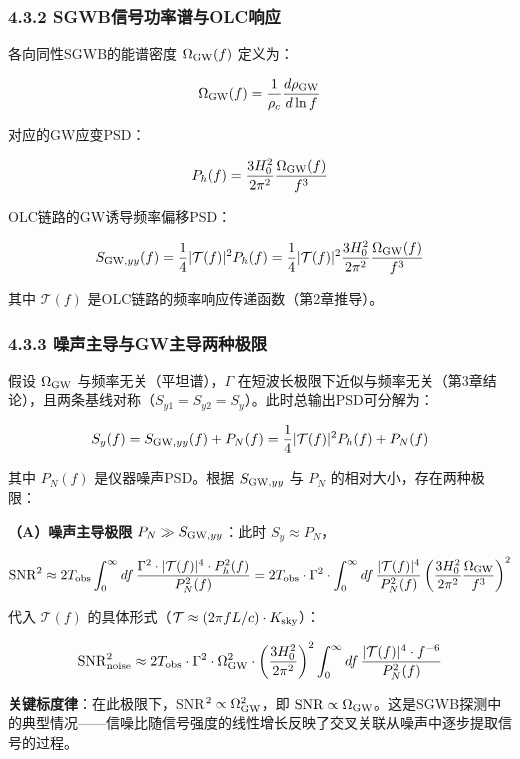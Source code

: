 \documentclass[12pt,a4paper]{article}
\begin{document}
\subsubsection{4.3.2 SGWB信号功率谱与OLC响应}


各向同性SGWB的能谱密度 $\Omega_{\rm GW}(f)$ 定义为：

$$\Omega_{\rm GW}(f) = \frac{1}{\rho_c} \frac{d\rho_{\rm GW}}{d\ln f}$$

对应的GW应变PSD：

$$P_h(f) = \frac{3H_0^2}{2\pi^2} \frac{\Omega_{\rm GW}(f)}{f^3}$$

OLC链路的GW诱导频率偏移PSD：

$$S_{{\rm GW},yy}(f) = \frac{1}{4} |\mathcal{T}(f)|^2 P_h(f) = \frac{1}{4} |\mathcal{T}(f)|^2 \frac{3H_0^2}{2\pi^2} \frac{\Omega_{\rm GW}(f)}{f^3}$$

其中 $\mathcal{T}(f)$ 是OLC链路的频率响应传递函数（第2章推导）。

\subsubsection{4.3.3 噪声主导与GW主导两种极限}


假设 $\Omega_{\rm GW}$ 与频率无关（平坦谱），$\Gamma$ 在短波长极限下近似与频率无关（第3章结论），且两条基线对称（$S_{y1} = S_{y2} = S_y$）。此时总输出PSD可分解为：

$$S_y(f) = S_{{\rm GW},yy}(f) + P_N(f) = \frac{1}{4} |\mathcal{T}(f)|^2 P_h(f) + P_N(f)$$

其中 $P_N(f)$ 是仪器噪声PSD。根据 $S_{{\rm GW},yy}$ 与 $P_N$ 的相对大小，存在两种极限：

\textbf{（A）噪声主导极限} $P_N \gg S_{{\rm GW},yy}$：此时 $S_y \approx P_N$，

$${\rm SNR}^2 \approx 2 T_{\rm obs} \int_0^\infty df\, \frac{\Gamma^2 \cdot |\mathcal{T}(f)|^4 \cdot P_h^2(f)}{P_N^2(f)} = 2 T_{\rm obs} \cdot \Gamma^2 \cdot \int_0^\infty df\, \frac{|\mathcal{T}(f)|^4}{P_N^2(f)} \left( \frac{3H_0^2}{2\pi^2} \frac{\Omega_{\rm GW}}{f^3} \right)^2$$

代入 $\mathcal{T}(f)$ 的具体形式（$\mathcal{T} \approx (2\pi f L/c) \cdot K_{\rm sky}$）：

$${\rm SNR}^2_{\rm noise} \approx 2 T_{\rm obs} \cdot \Gamma^2 \cdot \Omega_{\rm GW}^2 \cdot \left( \frac{3H_0^2}{2\pi^2} \right)^2 \int_0^\infty df\, \frac{|\mathcal{T}(f)|^4 \cdot f^{-6}}{P_N^2(f)}$$

\textbf{关键标度律}：在此极限下，SNR$^2 \propto \Omega_{\rm GW}^2$，即 ${\rm SNR} \propto \Omega_{\rm GW}$。这是SGWB探测中的典型情况——信噪比随信号强度的线性增长反映了交叉关联从噪声中逐步提取信号的过程。
\end{document}
